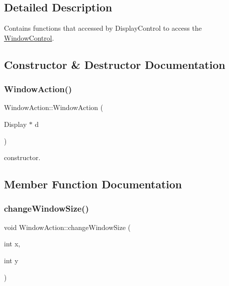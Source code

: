 \subsection{Detailed Description}
Contains functions that accessed by Display\+Control to access the \hyperlink{classUbuntuController_1_1WindowControl}{Window\+Control}. 

\subsection{Constructor \& Destructor Documentation}
\mbox{\label{classUbuntuController_1_1WindowAction_a1836cf300ad545fa88f33454d09765e1}} 
\subsubsection{\texorpdfstring{Window\+Action()}{WindowAction()}}
{\footnotesize\ttfamily Window\+Action\+::\+Window\+Action (\begin{DoxyParamCaption}\item[{Display $\ast$}]{d }\end{DoxyParamCaption})}

constructor. 

\subsection{Member Function Documentation}
\mbox{\label{classUbuntuController_1_1WindowAction_ac7145d79c3b902a716d554d09e6e2a63}} 
\subsubsection{\texorpdfstring{change\+Window\+Size()}{changeWindowSize()}}
{\footnotesize\ttfamily void Window\+Action\+::change\+Window\+Size (\begin{DoxyParamCaption}\item[{int}]{x,  }\item[{int}]{y }\end{DoxyParamCaption})}

